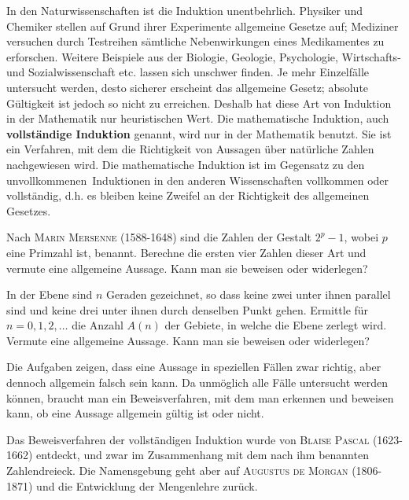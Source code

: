 \documentclass[%
11pt,%
twoside,%
titlepage,%
german,%
headsepline%
]{scrartcl}
\begin{document}
In den Naturwissenschaften ist die Induktion unentbehrlich. Physiker und Chemiker stellen auf Grund ihrer Experimente allgemeine Gesetze auf; Mediziner versuchen durch Testreihen s\"amtliche Nebenwirkungen eines Medikamentes zu erforschen. Weitere Beispiele aus der Biologie, Geologie, Psychologie, Wirtschafts- und Sozialwissenschaft etc. lassen sich unschwer finden. Je mehr Einzelf\"alle untersucht werden, desto sicherer erscheint das allgemeine Gesetz; absolute G\"ultigkeit ist jedoch so nicht zu erreichen. Deshalb hat diese Art von Induktion in der Mathematik nur heuristischen Wert. Die mathematische Induktion, auch \textbf{vollst\"andige Induktion} genannt, wird nur in der Mathematik benutzt. Sie ist ein Verfahren, mit dem die Richtigkeit von Aussagen \"uber nat\"urliche Zahlen nachgewiesen wird. Die mathematische Induktion ist im Gegensatz zu den \glqq unvollkommenen\grqq\ Induktionen in den anderen Wissenschaften vollkommen oder vollst\"andig, d.h. es bleiben keine Zweifel an der Richtigkeit des allgemeinen Gesetzes.

\begin{ueb}
Nach \textsc{Marin Mersenne} (1588-1648) sind die Zahlen der Gestalt $2^p-1$, wobei $p$ eine Primzahl ist, benannt. Berechne die ersten vier Zahlen dieser Art und vermute eine allgemeine Aussage. Kann man sie beweisen oder widerlegen?
\end{ueb}

\begin{ueb}
In der Ebene sind $n$ Geraden gezeichnet, so dass keine zwei unter ihnen parallel sind und keine drei unter ihnen durch denselben Punkt gehen. Ermittle f\"ur $n = 0, 1,2, \dots$ die Anzahl $A(n)$ der Gebiete, in welche die Ebene zerlegt wird. Vermute eine allgemeine Aussage. Kann man sie beweisen oder widerlegen?
\end{ueb}

Die Aufgaben zeigen, dass eine Aussage in speziellen F\"allen zwar richtig, aber dennoch allgemein falsch sein kann. Da unm\"oglich alle F\"alle untersucht werden k\"onnen, braucht man ein Beweisverfahren, mit dem man erkennen und beweisen kann, ob eine Aussage allgemein g\"ultig ist oder nicht.

Das Beweisverfahren der vollst\"andigen Induktion wurde von \textsc{Blaise Pascal} (1623-1662) entdeckt, und zwar im Zusammenhang mit dem nach ihm benannten Zahlendreieck. Die Namensgebung geht aber auf \textsc{Augustus de Morgan} (1806-1871) und die Entwicklung der Mengenlehre zur\"uck.
\end{document}
